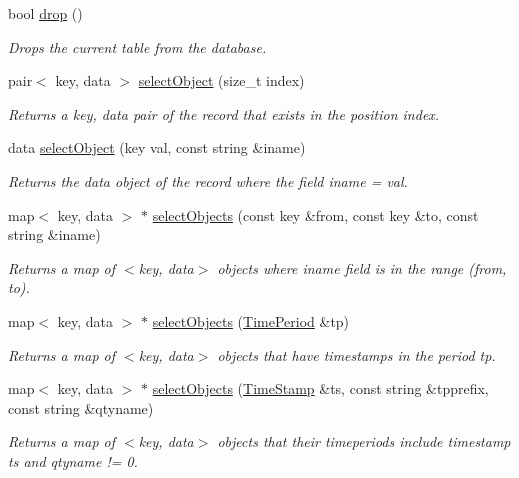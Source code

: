 \begin{CompactItemize}
bool \hyperlink{classSQLTable_SQLTablea6}{drop} ()
\begin{CompactList}\small\item\em Drops the current table from the database.\item\end{CompactList}\item 
pair$<$ key, data $>$ \hyperlink{classSQLTable_SQLTablea7}{select\-Object} (size\_\-t index)
\begin{CompactList}\small\item\em Returns a key, data pair of the record that exists in the position index.\item\end{CompactList}\item 
data \hyperlink{classSQLTable_SQLTablea8}{select\-Object} (key val, const string \&iname)
\begin{CompactList}\small\item\em Returns the data object of the record where the field iname = val.\item\end{CompactList}\item 
map$<$ key, data $>$ $\ast$ \hyperlink{classSQLTable_SQLTablea9}{select\-Objects} (const key \&from, const key \&to, const string \&iname)
\begin{CompactList}\small\item\em Returns a map of $<$key, data$>$ objects where iname field is in the range (from, to).\item\end{CompactList}\item 
map$<$ key, data $>$ $\ast$ \hyperlink{classSQLTable_SQLTablea10}{select\-Objects} (\hyperlink{classTimePeriod}{Time\-Period} \&tp)
\begin{CompactList}\small\item\em Returns a map of $<$key, data$>$ objects that have timestamps in the period tp.\item\end{CompactList}\item 
map$<$ key, data $>$ $\ast$ \hyperlink{classSQLTable_SQLTablea11}{select\-Objects} (\hyperlink{classTimeStamp}{Time\-Stamp} \&ts, const string \&tpprefix, const string \&qtyname)
\begin{CompactList}\small\item\em Returns a map of $<$key, data$>$ objects that their timeperiods include timestamp ts and qtyname != 0.\item\end{CompactList}\item 

\end{CompactItemize}
